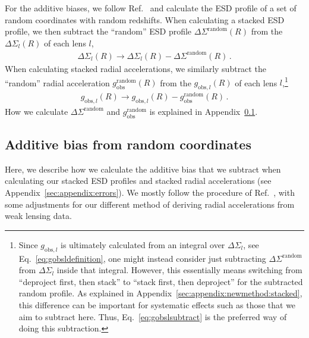 \documentclass[a4paper,11pt]{article}
\begin{document}
For the additive biases, we follow Ref.~\cite{Brouwer2021} and calculate the ESD profile of a set of random coordinates with random redshifts.
When calculating a stacked ESD profile, we then subtract the ``random'' ESD profile $\Delta \Sigma^{\mathrm{random}}(R)$ from the $\Delta \Sigma_l(R)$ of each lens $l$,
\begin{align}
 \Delta \Sigma_l(R) \to \Delta \Sigma_l(R)  - \Delta \Sigma^{\mathrm{random}}(R) \,.
\end{align}
When calculating stacked radial accelerations, we similarly subtract the ``random'' radial acceleration $g_{\mathrm{obs}}^{\mathrm{random}}(R)$ from the $g_{\mathrm{obs},l}(R)$ of each lens $l$,\footnote{
 Since $g_{\mathrm{obs},l}$ is ultimately calculated from an integral over $\Delta \Sigma_l$, see Eq.~\eqref{eq:gobsldefinition}, one might instead consider just subtracting $\Delta \Sigma^{\mathrm{random}}$ from $\Delta \Sigma_l$ inside that integral.
 However, this essentially means switching from ``deproject first, then stack'' to ``stack first, then deproject'' for the subtracted random profile.
 As explained in Appendix~\ref{sec:appendix:newmethod:stacked}, this difference can be important for systematic effects such as those that we aim to subtract here.
 Thus, Eq.~\eqref{eq:gobslsubtract} is the preferred way of doing this subtraction.
}
\begin{align}
 \label{eq:gobslsubtract}
 g_{\mathrm{obs},l}(R) \to g_{\mathrm{obs},l}(R)  - g_{\mathrm{obs}}^{\mathrm{random}}(R) \,.
\end{align}
How we calculate $\Delta \Sigma^{\mathrm{random}}$ and $g_{\mathrm{obs}}^{\mathrm{random}}$ is explained in Appendix~\ref{sec:appendix:randomESD}.


\subsection{Additive bias from random coordinates}
\label{sec:appendix:randomESD}

Here, we describe how we calculate the additive bias that we subtract when calculating our stacked ESD profiles and stacked radial accelerations (see Appendix~\ref{sec:appendix:errors}).
We mostly follow the procedure of Ref.~\cite{Brouwer2021}, with some adjustments for our different method of deriving radial accelerations from weak lensing data.
\end{document}
